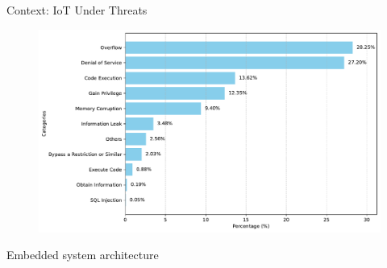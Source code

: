 \begin{frame}{Context: IoT Under Threats}
    \begin{center}
        \begin{minipage}[r]{.4\textwidth}
            \begin{figure}
                \centering
                \includegraphics[width=\textwidth]{src/1_introduction/img/threats_iot_graph.pdf}
            \end{figure}
        \end{minipage}\hspace{.5cm}%
        \begin{minipage}[c]{0.3\textwidth}
        \end{minipage}
    \end{center}
\end{frame}

\begin{frame}{Embedded system architecture}
\end{frame}
